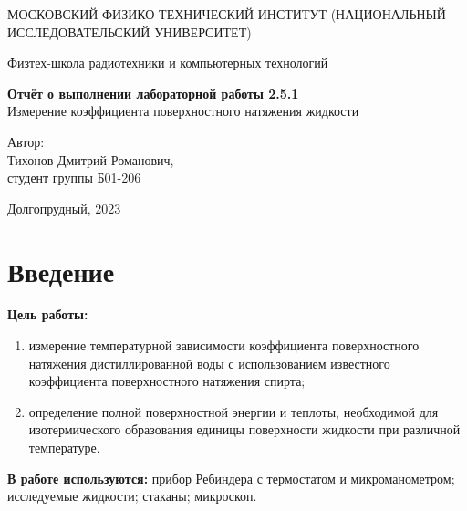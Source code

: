 \documentclass[a4paper, 12pt]{article}
\begin{document}
    \begin{titlepage}
	\begin{center}
            {\large МОСКОВСКИЙ ФИЗИКО-ТЕХНИЧЕСКИЙ ИНСТИТУТ (НАЦИОНАЛЬНЫЙ       ИССЛЕДОВАТЕЛЬСКИЙ УНИВЕРСИТЕТ)}
	\end{center}
 
	\begin{center}
		{\large Физтех-школа радиотехники и компьютерных технологий}
	\end{center}
	
	\vspace{8cm}
	{\LARGE
		\begin{center}
                {\bf Отчёт о выполнении лабораторной работы 2.5.1}\\
                Измерение коэффициента поверхностного натяжения жидкости
		\end{center}
	}
	\vspace{5cm}
	\begin{flushright}
		{\Large Автор:\\ Тихонов Дмитрий Романович, \\
			\vspace{0.2cm}
			студент группы Б01-206}
	\end{flushright}
	\vspace{5cm}
	\begin{center}
		\Large Долгопрудный, 2023
	\end{center}
    \end{titlepage}

    \section*{Введение}

    \noindent \textbf{Цель работы:}  
    \begin{enumerate}
        \item измерение температурной зависимости  коэффициента поверхностного натяжения дистиллированной воды с использованием известного коэффициента поверхностного натяжения спирта;
        \item определение полной поверхностной энергии  и теплоты, необходимой для изотермического образования единицы  поверхности жидкости  при различной температуре.
    \end{enumerate}

    \noindent \textbf{В работе используются:} прибор  Ребиндера  с термостатом и микроманометром; исследуемые жидкости; стаканы; микроскоп.
    
\end{document}
